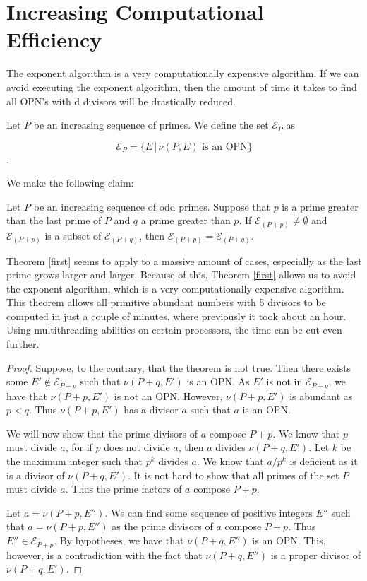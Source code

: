 \documentclass[../paper.tex]{subfiles}
\begin{document}
\section{Increasing Computational Efficiency}

The exponent algorithm is a very computationally expensive
algorithm. If we can avoid executing the exponent algorithm, then
the amount of time it takes to find all OPN's with d divisors will
be drastically reduced. 

Let $P$ be an increasing sequence of primes. We define the set
$\mathcal{E}_P$ as 

$$\mathcal{E}_P = \{E\, |\, \nu(P, E) \text{ is an OPN}\}$$.

We make the following claim:

\begin{theorem}\label{first}
Let $P$ be an increasing sequence of odd primes. Suppose
that $p$ is a prime greater than the last prime of $P$ and $q$ a
prime greater than $p$. If $\mathcal{E}_{(P + p)} \neq 
\emptyset$ and $\mathcal{E}_{(P + p)}$ is a subset of 
$\mathcal{E}_{(P + q)}$, then $\mathcal{E}_{(P + p)} = 
\mathcal{E}_{(P + q)}$.
\end{theorem}

Theorem {\ref{first}} seems to apply to a massive amount of cases,
especially as the last prime grows larger and larger. Because of
this, Theorem {\ref{first}} allows us to avoid the exponent algorithm,
which is a very computationally expensive algorithm. This theorem
allows all primitive abundant numbers with 5 divisors to be
computed in just a couple of minutes, where previously it took
about an hour. Using multithreading abilities on certain
processors, the time can be cut even further.


\begin{proof}
  Suppose, to the contrary, that the theorem is not true. Then
there exists some $E' \notin \mathcal{E}_{P + p}$ such that $\nu
(P + q, E')$ is an OPN. As $E'$ is not in $\mathcal{E}_{P + p}$,
we have that $\nu (P + p, E')$ is not an OPN. However, $\nu (P +
p, E')$ is abundant as $p < q$. Thus $\nu (P + p, E')$ has a
divisor $a$ such that $a$ is an OPN. 

  We will now show that the prime divisors of $a$ compose $P + p$.
We know that $p$ must divide $a$, for if $p$ does not divide $a$,
then $a$ divides $\nu (P + q, E')$. Let $k$ be the maximum
integer such that $p^k$ divides $a$. We know that $a / p^k$ is
deficient as it is a divisor of $\nu (P + q, E')$. It is not hard
to show that all primes of the set $P$ must divide $a$. Thus the
prime factors of $a$ compose $P + p$. 

  Let $a = \nu(P + p, E'')$. We can find some sequence of positive
integers $E''$ such that $a = \nu (P + p, E'')$ as the prime divisors
of $a$ compose $P + p$. Thus $E'' \in \mathcal{E}_{P + p}$. By
hypotheses, we have that $\nu(P + q, E'')$ is an OPN. This,
however, is a contradiction with the fact that $\nu(P + q, E'')$
is a proper divisor of $\nu(P + q, E')$.
\end{proof}
\end{document}
